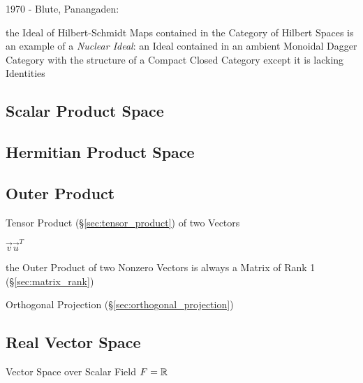 
1970 - Blute, Panangaden:

the Ideal of Hilbert-Schmidt Maps contained in the Category of Hilbert
Spaces is an example of a \emph{Nuclear Ideal}: an Ideal contained in
an ambient Monoidal Dagger Category with the structure of a Compact
Closed Category except it is lacking Identities



\subsection{Scalar Product Space}\label{sec:scalar_product_space}

\subsection{Hermitian Product Space}\label{sec:hermitian_product_space}

\subsection{Outer Product}\label{sec:outer_product}

Tensor Product (\S\ref{sec:tensor_product}) of two Vectors

$\vec{v}\vec{u}^T$

the Outer Product of two Nonzero Vectors is always a Matrix of Rank 1
(\S\ref{sec:matrix_rank})

\fist Orthogonal Projection (\S\ref{sec:orthogonal_projection})



\subsection{Real Vector Space}\label{sec:real_vector_space}

Vector Space over Scalar Field $F = \mathbb{R}$


